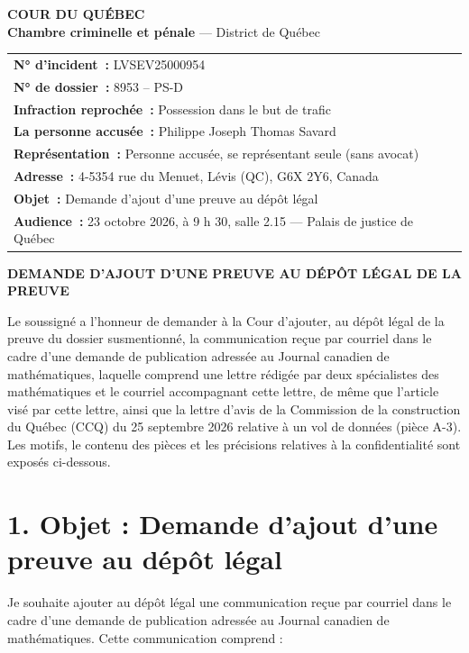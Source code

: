 \documentclass[12pt,a4paper]{article}
\begin{document}
\begin{center}
{\large\bfseries COUR DU QUÉBEC}\\[2pt]
{\bfseries Chambre criminelle et pénale} — District de Québec
\end{center}
\vspace{4pt}

\noindent\begin{tabular}{@{}p{\textwidth}@{}}
\noindent\textbf{N° d’incident~:} LVSEV25000954\\[2pt]
\noindent\textbf{N° de dossier~:} 8953 – PS-D\\[2pt]
\noindent\textbf{Infraction reprochée~:} Possession dans le but de trafic\\[2pt]
\noindent\textbf{La personne accusée~:} Philippe Joseph Thomas Savard\\[2pt]
\noindent\textbf{Représentation~:} Personne accusée, se représentant seule (sans avocat)\\[2pt]
\noindent\textbf{Adresse~:} 4-5354 rue du Menuet, Lévis (QC), G6X 2Y6, Canada\\[2pt]
\noindent\textbf{Objet~:} Demande d’ajout d’une preuve au dépôt légal\\[2pt]
\noindent\textbf{Audience~:} 23 octobre 2026, à 9 h 30, salle 2.15 — Palais de justice de Québec\\[2pt]
\end{tabular}


\vspace{6pt}
\begin{center}
{\bfseries DEMANDE D’AJOUT D’UNE PREUVE AU DÉPÔT LÉGAL DE LA PREUVE}
\end{center}
\vspace{2pt}

Le soussigné a l’honneur de demander à la Cour d’ajouter, au dépôt légal de la preuve du dossier susmentionné, la communication reçue par courriel dans le cadre d’une demande de publication adressée au Journal canadien de mathématiques, laquelle comprend une lettre rédigée par deux spécialistes des mathématiques et le courriel accompagnant cette lettre, de même que l’article visé par cette lettre, ainsi que la lettre d’avis de la Commission de la construction du Québec (CCQ) du 25 septembre 2026 relative à un vol de données (pièce A-3). Les motifs, le contenu des pièces et les précisions relatives à la confidentialité sont exposés ci-dessous.

\section*{1. Objet : Demande d’ajout d’une preuve au dépôt légal}
Je souhaite ajouter au dépôt légal une communication reçue par courriel dans le cadre d’une demande de publication adressée au Journal canadien de mathématiques. Cette communication comprend :
\end{document}
